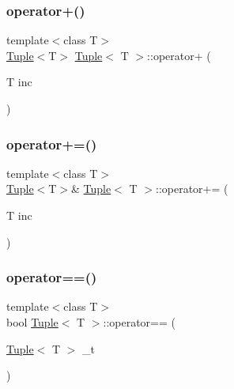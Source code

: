 \subsubsection{\texorpdfstring{operator+()}{operator+()}}
{\footnotesize\ttfamily template$<$class T$>$ \\
\mbox{\hyperlink{class_tuple}{Tuple}}$<$T$>$ \mbox{\hyperlink{class_tuple}{Tuple}}$<$ T $>$\+::operator+ (\begin{DoxyParamCaption}\item[{T}]{inc }\end{DoxyParamCaption})\hspace{0.3cm}{\ttfamily [inline]}}

\mbox{\label{class_tuple_aeace0f594f48529ddf3385cb2f023daf}} 
\subsubsection{\texorpdfstring{operator+=()}{operator+=()}}
{\footnotesize\ttfamily template$<$class T$>$ \\
\mbox{\hyperlink{class_tuple}{Tuple}}$<$T$>$\& \mbox{\hyperlink{class_tuple}{Tuple}}$<$ T $>$\+::operator+= (\begin{DoxyParamCaption}\item[{T}]{inc }\end{DoxyParamCaption})\hspace{0.3cm}{\ttfamily [inline]}}

\mbox{\label{class_tuple_ad8f90a7c0726fae5ac5651c4e16222cd}} 
\subsubsection{\texorpdfstring{operator==()}{operator==()}}
{\footnotesize\ttfamily template$<$class T$>$ \\
bool \mbox{\hyperlink{class_tuple}{Tuple}}$<$ T $>$\+::operator== (\begin{DoxyParamCaption}\item[{\mbox{\hyperlink{class_tuple}{Tuple}}$<$ T $>$}]{\+\_\+t }\end{DoxyParamCaption})\hspace{0.3cm}{\ttfamily [inline]}}

